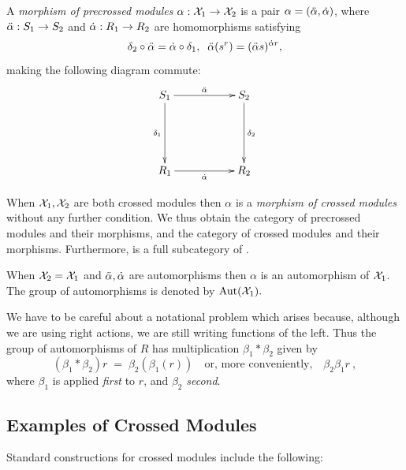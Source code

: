 A \emph{morphism of precrossed modules}  
$\alpha : \mathcal{X}_1 \to \mathcal{X}_2$ 
is a pair  $\alpha = (\ddot{\alpha}, \dot{\alpha})$, where 
$\ddot{\alpha} : S_1 \to S_2$ and $\dot{\alpha} : R_1 \to R_2$ are homomorphisms satisfying
$$
\delta_2 \circ \ddot{\alpha} = \dot{\alpha} \circ \delta_1, \; \;
\ddot{\alpha}(s^r) = (\ddot{\alpha}  s)^{\dot{\alpha} r},
$$
making the following diagram commute:
\begin{equation} \label{eq:prexmod-morph} 
\vcenter{\xymatrix{ 
  S_1 \ar[rr]^{\dda} \ar[dd]_{\delta_1}
     && S_2 \ar[dd]^{\delta_2} \\
     &&  \\
  R_1 \ar[rr]_{\da}
     && R_2
}}
\end{equation} 

When  $\mathcal{X}_1, \mathcal{X}_2$  are both crossed modules then  $\alpha$
is a \emph{morphism of crossed modules} 
without any further condition.
We thus obtain the category
{{\catPreXMod}} of precrossed modules and their morphisms,
and the category {\catXMod} of crossed modules and their morphisms.
Furthermore, {\catXMod} is a full subcategory of {\catPreXMod}.

When $\mathcal{X}_2 = \mathcal{X}_1$
and $\ddot{\alpha},\dot{\alpha}$ are automorphisms then 
$\alpha$  is an automorphism of $\mathcal{X}_1$. 
The group of automorphisms is denoted 
by $\mathrm{Aut}(\mathcal{X}_1).$ 

We have to be careful about a notational problem 
which arises because, although we are using right actions,
we are still writing functions of the left.
Thus the group of automorphisms of $R$ has multiplication
$\beta_1 * \beta_2$  given by
$$ 
(\beta_1 * \beta_2)r \;=\; \beta_2(\beta_1(r))
\quad \mbox{or, more conveniently,} \quad
\beta_2 \beta_1 r~,
$$ 
where $\beta_1$ is applied \emph{first} to $r$, 
and $\beta_2$ \emph{second}.



\subsection{Examples of Crossed Modules} \label{subsec:ex-xmod} 

Standard constructions for crossed modules include the following:

